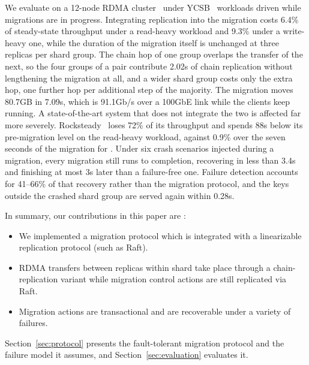 We evaluate \OurImplementation{} on a 12-node RDMA cluster~\cite{cloudlab} under
YCSB~\cite{ycsb} workloads driven while migrations are in progress.
Integrating replication into the migration costs 6.4\% of steady-state throughput under a
read-heavy workload and 9.3\% under a write-heavy one, while the duration of the migration
itself is unchanged at three replicas per shard group.
The chain hop of one group overlaps the transfer of the next, so the four groups of a pair
contribute 2.02s of chain replication without lengthening the migration at all, and a wider
shard group costs only the extra hop, one further hop per additional step of the majority.
The migration moves 80.7GB in 7.09s, which is 91.1Gb/s over a 100GbE link while the clients
keep running.
A state-of-the-art system that does not integrate the two is affected far more severely.
Rocksteady~\cite{rocksteady} loses 72\% of its throughput and spends 88s below its
pre-migration level on the read-heavy workload, against 0.9\% over the seven seconds of the
migration for \OurImplementation{}.
Under six crash scenarios injected during a migration, every migration still runs to
completion, recovering in less than 3.4s and finishing at most 3s later than a failure-free
one.
Failure detection accounts for 41--66\% of that recovery rather than the migration protocol,
and the keys outside the crashed shard group are served again within 0.28s.

In summary, our contributions in this paper are :
\begin{itemize}
\item We implemented a migration protocol which is integrated with a linearizable replication protocol (such as Raft).
\item RDMA transfers between replicas within shard take place through a chain-replication variant 
while migration control actions are still replicated via Raft.
\item Migration actions are transactional and are recoverable under a variety of failures.
\end{itemize}

Section~\ref{sec:protocol} presents the fault-tolerant migration protocol and the failure
model it assumes, and Section~\ref{sec:evaluation} evaluates it.
